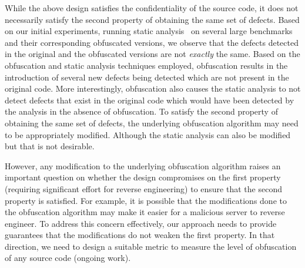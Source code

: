 \documentclass[twocolumn]{article}
\begin{document}
While the above design satisfies the confidentiality of the source code, it does not necessarily 
satisfy the second property of obtaining the same set of defects. Based on our initial experiments, 
running static analysis~\cite{findbugs} on several large benchmarks~\cite{tomcat,lucene,eclipse} 
and their corresponding obfuscated versions, we observe that the defects detected in the original 
and the obfuscated versions are not {\em exactly} the same. Based on the obfuscation and static analysis techniques 
employed, obfuscation results in the introduction of several new defects being detected which are not 
present in the original code. More interestingly, obfuscation also causes the static analysis to not 
detect defects that exist in the original code which would have been detected by the analysis in the 
absence of obfuscation. To satisfy the second property of obtaining the same set of defects, the underlying 
obfuscation algorithm may need to be appropriately modified. Although the static analysis can also be 
modified but that is not desirable.
 
However, any modification to the underlying obfuscation algorithm raises an important question on whether 
the design compromises on the first property (requiring significant effort for reverse engineering) 
to ensure that the second property is satisfied. For example, it is possible that the modifications 
done to the obfuscation algorithm may make it easier for a malicious server to reverse engineer. 
To address this concern effectively, our approach needs to provide guarantees that the modifications 
do not weaken the first property. In that direction, we need to design a suitable metric to 
measure the level of obfuscation of any source code (ongoing work). 

\end{document}
